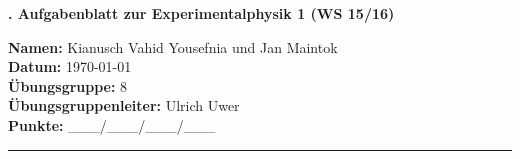 \begin{centering}
  \vspace*{5pt}
  \Large{\textbf{\nr. Aufgabenblatt zur Experimentalphysik 1 (WS 15/16)}}\\
  \vspace*{10pt}
  \huge{\textbf{\tit}}
  \vspace*{10pt}

\normalsize{\textbf{Namen:} Kianusch Vahid Yousefnia und Jan Maintok} \\
\textbf{Datum: } \today \\
 \textbf{Übungsgruppe:} 8\\
 \textbf{Übungsgruppenleiter:} Ulrich Uwer \\

\vspace*{10pt}
 \textbf{Punkte: } \_\_\_/\_\_\_/\_\_\_/\_\_\_
 
 \end{centering}

 \vspace*{25pt}

 \rule{\textwidth}{1pt}

